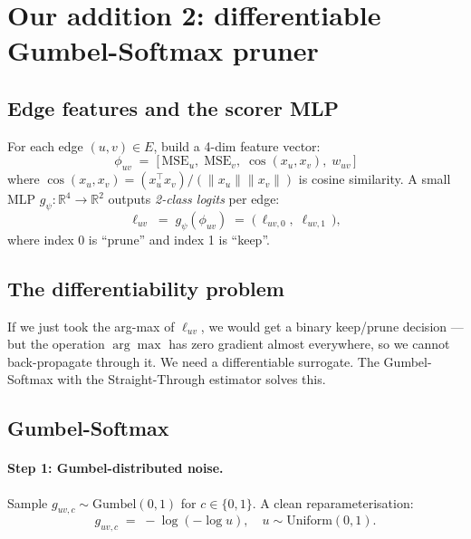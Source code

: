 \documentclass[11pt,a4paper]{article}
\begin{document}
\section{Our addition 2: differentiable Gumbel-Softmax pruner}
\label{sec:pruner}

\subsection{Edge features and the scorer MLP}

For each edge $(u,v) \in E$, build a 4-dim feature vector:
\begin{equation}
\phi_{uv} \;=\; \big[\,\mathrm{MSE}_u,\; \mathrm{MSE}_v,\;
                       \cos(x_u, x_v),\; w_{uv}\,\big]
\label{eq:phi}
\end{equation}
where $\cos(x_u, x_v) = (x_u^\top x_v)/(\|x_u\|\|x_v\|)$ is cosine
similarity. A small MLP $g_\psi : \mathbb{R}^4 \to \mathbb{R}^2$ outputs
\emph{2-class logits} per edge:
\begin{equation}
\ell_{uv} \;=\; g_\psi(\phi_{uv})
\;=\; \big(\,\ell_{uv,0},\; \ell_{uv,1}\,\big),
\label{eq:logits}
\end{equation}
where index 0 is ``prune'' and index 1 is ``keep''.

\subsection{The differentiability problem}

If we just took the arg-max of $\ell_{uv}$, we would get a binary
keep/prune decision --- but the operation $\arg\max$ has zero gradient
almost everywhere, so we cannot back-propagate through it. We need a
differentiable surrogate. The Gumbel-Softmax with the
Straight-Through estimator solves this.

\subsection{Gumbel-Softmax}

\paragraph{Step 1: Gumbel-distributed noise.}
Sample
\(g_{uv,c} \sim \mathrm{Gumbel}(0,1)\) for $c \in \{0,1\}$. A clean
reparameterisation:
\[g_{uv,c} \;=\; -\log(-\log u),\quad u \sim \mathrm{Uniform}(0,1).\]
\end{document}
